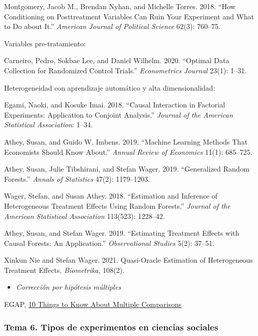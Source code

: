 \documentclass[
  12pt,
]{article}
\providecommand{\tightlist}{%
  \setlength{\itemsep}{0pt}\setlength{\parskip}{0pt}}
\begin{document}
Montgomery, Jacob M., Brendan Nyhan, and Michelle Torres. 2018. ``How
Conditioning on Posttreatment Variables Can Ruin Your Experiment and
What to Do about It.'' \emph{American Journal of Political Science}
62(3): 760--75.

Variables pre-tratamiento:

Carneiro, Pedro, Sokbae Lee, and Daniel Wilhelm. 2020. ``Optimal Data
Collection for Randomized Control Trials.'' \emph{Econometrics Journal}
23(1): 1--31.

Heterogeneidad con aprendizaje automático y alta dimensionalidad:

Egami, Naoki, and Kosuke Imai. 2018. ``Causal Interaction in Factorial
Experiments: Application to Conjoint Analysis.'' \emph{Journal of the
American Statistical Association}: 1--34.

Athey, Susan, and Guido W. Imbens. 2019. ``Machine Learning Methods That
Economists Should Know About.'' \emph{Annual Review of Economics} 11(1):
685--725.

Athey, Susan, Julie Tibshirani, and Stefan Wager. 2019. ``Generalized
Random Forests.'' \emph{Annals of Statistics} 47(2): 1179--1203.

Wager, Stefan, and Susan Athey. 2018. ``Estimation and Inference of
Heterogeneous Treatment Effects Using Random Forests.'' \emph{Journal of
the American Statistical Association} 113(523): 1228--42.

Athey, Susan, and Stefan Wager. 2019. ``Estimating Treatment Effects
with Causal Forests: An Application.'' \emph{Observational Studies}
5(2): 37--51.

Xinkun Nie and Stefan Wager. 2021. Quasi-Oracle Estimation of
Heterogeneous Treatment Effects. \emph{Biometrika}, 108(2).

\begin{itemize}
\tightlist
\item
  \emph{Corrección por hipótesis múltiples}
\end{itemize}

EGAP,
\href{https://egap.org/resource/10-things-to-know-about-multiple-comparisons/}{10
Things to Know About Multiple Comparisons}

\hypertarget{tema-6.-tipos-de-experimentos-en-ciencias-sociales-1}{%
\subsubsection{Tema 6. Tipos de experimentos en ciencias
sociales}\label{tema-6.-tipos-de-experimentos-en-ciencias-sociales-1}}
\end{document}
